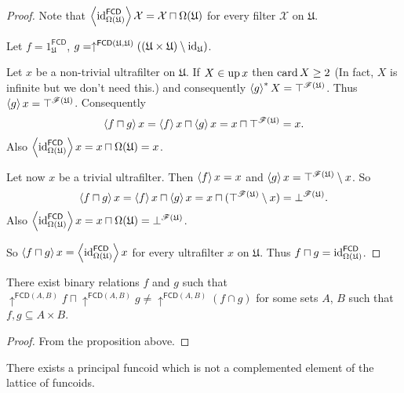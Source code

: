\begin{proof}
Note that $\left\langle \operatorname{id}_{\Omega(\mathfrak{U})}^{\mathsf{FCD}}\right\rangle\mathcal{X}=\mathcal{X}\sqcap\Omega(\mathfrak{U})$
for every filter $\mathcal{X}$ on $\mathfrak{U}$.

Let $f=1_{\mathfrak{U}}^{\mathsf{FCD}}$, $g=\uparrow^{\mathsf{FCD}(\mathfrak{U},\mathfrak{U})}((\mathfrak{U}\times\mathfrak{U})\setminus\operatorname{id}_{\mathfrak{U}})$.

Let $x$ be a non-trivial ultrafilter on $\mathfrak{U}$. If $X\in\operatorname{up} x$
then $\operatorname{card} X\ge2$ (In fact, $X$ is infinite but we don't need this.)
and consequently $\left\langle g\right\rangle ^{\ast}X=\top^{\mathscr{F}(\mathfrak{U})}$.
Thus $\left\langle g\right\rangle x=\top^{\mathscr{F}(\mathfrak{U})}$. Consequently
\[
\left\langle f\sqcap g\right\rangle x=\left\langle f\right\rangle x\sqcap\left\langle g\right\rangle x=x\sqcap\top^{\mathscr{F}(\mathfrak{U})}=x.
\]
Also $\left\langle \operatorname{id}_{\Omega(\mathfrak{U})}^{\mathsf{FCD}}\right\rangle x=x\sqcap\Omega(\mathfrak{U})=x$.

Let now $x$ be a trivial ultrafilter. Then $\left\langle f\right\rangle x=x$ and $\left\langle g\right\rangle x=\top^{\mathscr{F}(\mathfrak{U})}\setminus x$.
So
\[
\left\langle f\sqcap g\right\rangle x=\left\langle f\right\rangle x\sqcap\left\langle g\right\rangle x=x\sqcap(\top^{\mathscr{F}(\mathfrak{U})}\setminus x)=\bot^{\mathscr{F}(\mathfrak{U})}.
\]
Also $\left\langle \operatorname{id}_{\Omega(\mathfrak{U})}^{\mathsf{FCD}}\right\rangle x=x\sqcap\Omega(\mathfrak{U})=\bot^{\mathscr{F}(\mathfrak{U})}$.

So $\left\langle f\sqcap g\right\rangle x=\left\langle \operatorname{id}_{\Omega(\mathfrak{U})}^{\mathsf{FCD}}\right\rangle x$
for every ultrafilter $x$ on $\mathfrak{U}$. Thus $f\sqcap g=\operatorname{id}_{\Omega(\mathfrak{U})}^{\mathsf{FCD}}$.\end{proof}
\begin{example}
There exist binary relations $f$ and $g$ such that $\uparrow^{\mathsf{FCD}(A,B)}f\sqcap\uparrow^{\mathsf{FCD}(A,B)}g\ne\uparrow^{\mathsf{FCD}(A,B)}(f\cap g)$
for some sets $A$, $B$ such that $f,g\subseteq A\times B$.\end{example}
\begin{proof}
From the proposition above.\end{proof}
\begin{example}
There exists a principal funcoid which is not a complemented element
of the lattice of funcoids.\end{example}
